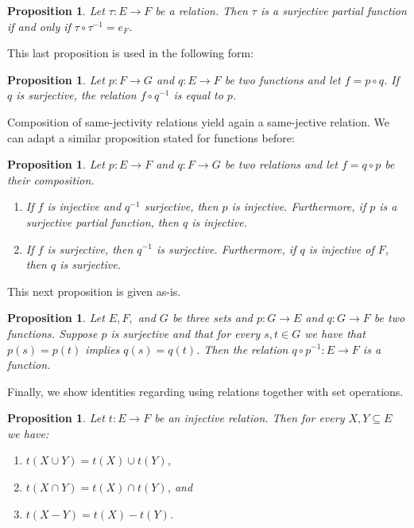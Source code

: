 \documentclass[11pt]{article}
\theoremstyle{plain}
\newtheorem{freeprop}[definition]{Proposition}
\theoremstyle{nonumberplain}
\newcommand{\inv}[1]{{#1}^{-1}}
\begin{document}
\begin{freeprop}
    Let $\tau : E \to F$ be a relation. Then $\tau$ is a surjective partial function if and only if $\tau \circ \inv \tau = e_F$.
\end{freeprop}

This last proposition is used in the following form:

\begin{freeprop}
    Let $p : F \to G$ and $q : E \to F$ be two functions and let $f = p \circ q$. If $q$ is surjective, the relation $f \circ \inv q$ is equal to $p$.
\end{freeprop}

Composition of same-jectivity relations yield again a same-jective relation. We can adapt a similar proposition stated for functions before:

\begin{freeprop}
    Let $p : E \to F$ and $q : F \to G$ be two relations and let $f = q \circ p$ be their composition.
    \begin{enumerate}
        \item If $f$ is injective and $\inv q$ surjective, then $p$ is injective. Furthermore, if $p$ is a surjective partial function, then $q$ is injective.
        \item If $f$ is surjective, then $\inv q$ is surjective. Furthermore, if $q$ is injective of $F$, then $q$ is surjective.
    \end{enumerate}
\end{freeprop}

This next proposition is given as-is.

\begin{freeprop}
    Let $E, F,$ and $G$ be three sets and $p : G \to E$ and $q : G \to F$ be two functions. Suppose $p$ is surjective and that for every $s, t \in G$ we have that $p(s) = p(t)$ implies $q(s) = q(t)$. Then the relation $q \circ \inv p : E \to F$ is a function. 
\end{freeprop}

Finally, we show identities regarding using relations together with set operations.

\begin{freeprop}
    Let $t : E \to F$ be an injective relation. Then for every $X, Y \subseteq E$ we have: \begin{enumerate}
        \item $t(X \cup Y) = t(X) \cup t(Y)$,
        \item $t(X \cap Y) = t(X) \cap t(Y)$, and
        \item $t(X - Y) = t(X) - t(Y)$.
    \end{enumerate}
\end{freeprop}
\end{document}
